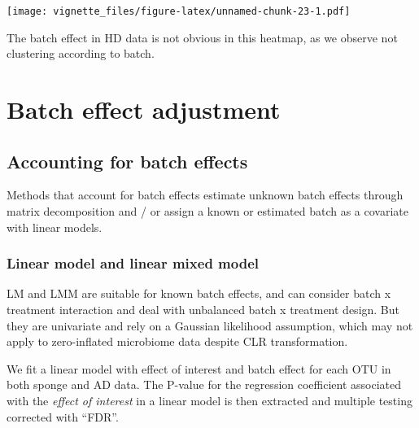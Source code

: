 \documentclass[]{book}
\begin{document}
\texttt{[image: vignette\_files/figure-latex/unnamed-chunk-23-1.pdf]}

The batch effect in HD data is not obvious in this heatmap, as we
observe not clustering according to batch.

\chapter{Batch effect adjustment}\label{adjust}

\section{Accounting for batch
effects}\label{accounting-for-batch-effects}

Methods that account for batch effects estimate unknown batch effects
through matrix decomposition and / or assign a known or estimated batch
as a covariate with linear models.

\subsection{Linear model and linear mixed
model}\label{linear-model-and-linear-mixed-model}

LM and LMM are suitable for known batch effects, and can consider batch
x treatment interaction and deal with unbalanced batch x treatment
design. But they are univariate and rely on a Gaussian likelihood
assumption, which may not apply to zero-inflated microbiome data despite
CLR transformation.

We fit a linear model with effect of interest and batch effect for each
OTU in both sponge and AD data. The P-value for the regression
coefficient associated with the \emph{effect of interest} in a linear
model is then extracted and multiple testing corrected with ``FDR''.
\end{document}
